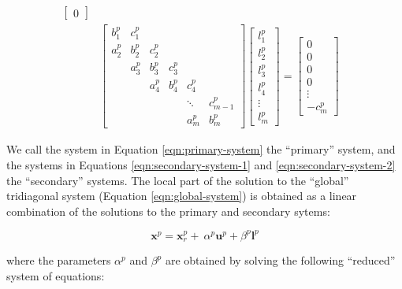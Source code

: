 \documentclass{elsarticle}
\begin{document}
\begin{align}
\begin{bmatrix}
0
\end{bmatrix} & \label{eqn:secondary-system-1} \\
%
%
%
& \begin{bmatrix}
b_1^p & c_1^p \\
a_2^p & b_2^p & c_2^p \\
      & a_3^p & b_3^p & c_3^p \\
      &       & a_4^p & b_4^p & c_4^p \\
      &       &       &       &  \ddots & c_{m-1}^p\\
      &       &       &       &     a_{m}^p  & b_{m}^p
\end{bmatrix}
\begin{bmatrix}
l_1^p \\
l_2^p \\
l_3^p \\
l_4^p \\
\vdots \\
l_m^p
\end{bmatrix}
=
\begin{bmatrix}
0 \\
0 \\
0 \\
0 \\
\vdots \\
-c_m^p
\end{bmatrix} & \label{eqn:secondary-system-2}
\end{align}

We call the system in Equation \ref{eqn:primary-system}
the ``primary'' system, and the systems in
Equations
\ref{eqn:secondary-system-1} and \ref{eqn:secondary-system-2}
the ``secondary'' systems.
The local part of the solution to the ``global'' tridiagonal system
(Equation \ref{eqn:global-system})
is obtained as a linear combination of
the solutions to the primary and secondary sytems:

\begin{equation}
    \boldsymbol{x}^p = \boldsymbol{x}_r^p + \
        \alpha^p \boldsymbol{u}^p + \beta^p \boldsymbol{l}^p
    \label{eqn:sum-of-systems}
\end{equation}

where the  parameters $\alpha^p$ and $\beta^p$ are obtained by
solving the following ``reduced'' system of equations:
\end{document}
